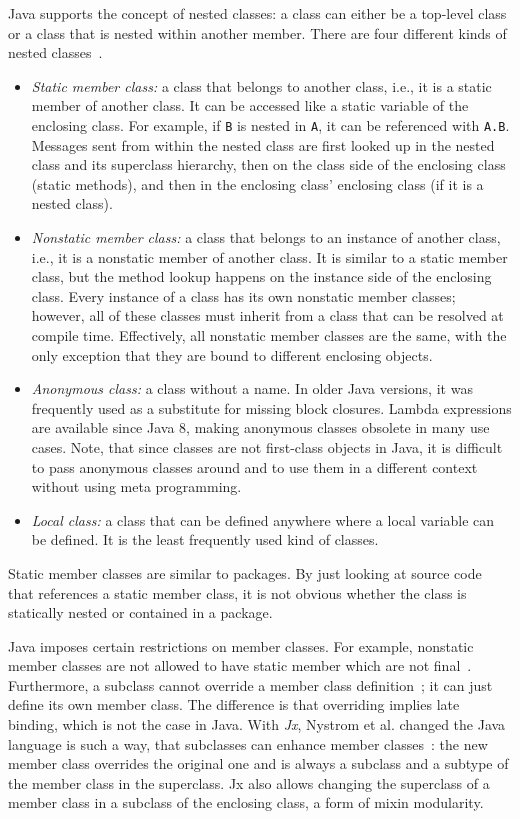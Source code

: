 Java supports the concept of nested classes: a class can either be a top-level class or a class that is nested within another member. There are four different kinds of nested classes~\cite{Bloch:2008:EJ:1377533}.
\begin{itemize}
	\item \emph{Static member class:} a class that belongs to another class, i.e., it is a static member of another class. It can be accessed like a static variable of the enclosing class. For example, if \texttt{B} is nested in \texttt{A}, it can be referenced with \texttt{A.B}. Messages sent from within the nested class are first looked up in the nested class and its superclass hierarchy, then on the class side of the enclosing class (static methods), and then in the enclosing class' enclosing class (if it is a nested class).
	\item \emph{Nonstatic member class:} a class that belongs to an instance of another class, i.e., it is a nonstatic member of another class. It is similar to a static member class, but the method lookup happens on the instance side of the enclosing class. Every instance of a class has its own nonstatic member classes; however, all of these classes must inherit from a class that can be resolved at compile time. Effectively, all nonstatic member classes are the same, with the only exception that they are bound to different enclosing objects.
	\item \emph{Anonymous class:} a class without a name. In older Java versions, it was frequently used as a substitute for missing block closures. Lambda expressions are available since Java 8, making anonymous classes obsolete in many use cases. Note, that since classes are not first-class objects in Java, it is difficult to pass anonymous classes around and to use them in a different context without using meta programming.
	\item \emph{Local class:} a class that can be defined anywhere where a local variable can be defined. It is the least frequently used kind of classes.
\end{itemize}

Static member classes are similar to packages. By just looking at source code that references a static member class, it is not obvious whether the class is statically nested or contained in a package.

Java imposes certain restrictions on member classes. For example, nonstatic member classes are not allowed to have static member which are not final~\cite{javalang1}. Furthermore, a subclass cannot override a member class definition~\cite{igarashi2002inner}; it can just define its own member class. The difference is that overriding implies late binding, which is not the case in Java. With \emph{Jx}, Nystrom et al. changed the Java language is such a way, that subclasses can enhance member classes~\cite{Nystrom:2004:SEV:1028976.1028986}: the new member class overrides the original one and is always a subclass and a subtype of the member class in the superclass. Jx also allows changing the superclass of a member class in a subclass of the enclosing class, a form of mixin modularity.

